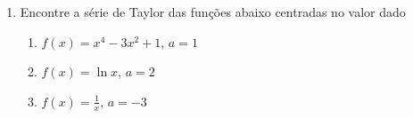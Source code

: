 \documentclass[a4paper,5pt]{amsbook}
\newcommand{\ds}{\displaystyle}
\begin{document}
\begin{enumerate}
    \item Encontre a s\'erie de Taylor das fun\c{c}\~oes abaixo centradas no valor dado
    	\begin{enumerate}
    		\item $f(x) = x^4 - 3x^2 + 1$, $a = 1$
    		\item $f(x) = \ln x$, $a = 2$
            \item $f(x) = \ds\frac{1}{x}$, $a=-3$
    	\end{enumerate}
\end{enumerate}
\end{document}
